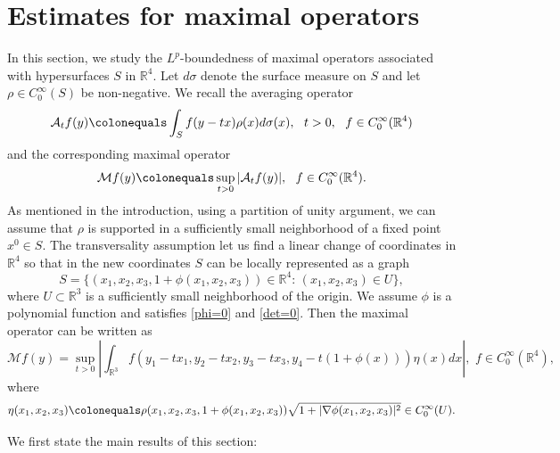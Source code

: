 \documentclass[a4paper, 11pt]{article}
\theoremstyle{plain}
\theoremstyle{definition}
\theoremstyle{lemma}
\theoremstyle{Remark}
\theoremstyle{proposition}
\theoremstyle{corollary}
\theoremstyle{example}
\theoremstyle{assumption}
\begin{document}


\section{Estimates for maximal operators }
In this section, we study the $L^p$-boundedness of maximal operators associated with hypersurfaces $S$ in $\mathbb{R}^4$.   Let $d\sigma$ denote the surface measure on $S$ and let
 $\rho\in C_0^{\infty}(S)$ be non-negative. We recall the averaging operator
 \begin{equation*}
 \mathcal{A}_tf(y)\colonequals \int_Sf(y-tx)\rho(x)d\sigma(x),\,\,\,\,t>0,\,\,\,\,f\in C^{\infty}_0(\mathbb{R}^4)
 \end{equation*}
 and  the corresponding  maximal operator
 \begin{equation*}
 \mathcal{M}f(y)\colonequals \sup_{t>0}|\mathcal{A}_tf(y)|, \,\,\,\,f\in C^{\infty}_0(\mathbb{R}^4).
 \end{equation*}
As mentioned in the introduction, using a partition of unity argument, we can assume that $\rho$ is supported in a sufficiently small neighborhood of a fixed point $x^0\in S.$ The transversality assumption let us find a linear change of coordinates in $\mathbb{R}^4$ so that in the new coordinates $S$ can be locally represented as a graph
\begin{equation}\label{S4}
S=\{(x_1,x_2,x_3, 1+\phi(x_1,x_2,x_3))\in \mathbb{R}^{4}:\,(x_1,x_2,x_3)\in U\},
\end{equation}
where $U\subset \mathbb{R}^3$ is a sufficiently small neighborhood of the origin.
 We assume $\phi$ is a polynomial function and satisfies \eqref{phi=0} and \eqref{det=0}.
  Then the maximal  operator  can be written as
 \begin{equation}\label{M}
 \mathcal{M}f(y)= \sup_{t>0}\left| \int_{\mathbb{R}^3}f(y_1-tx_1, y_2-tx_2, y_3-tx_3, y_4-t(1+\phi(x)))\eta(x)dx\right|, \,\,f\in C^{\infty}_0(\mathbb{R}^4),
 \end{equation}
  where  $$\eta(x_1,x_2,x_3)\colonequals \rho(x_1,x_2,x_3,1+\phi(x_1,x_2,x_3))\sqrt{1+|\nabla \phi(x_1,x_2,x_3)|^2}\in C^{\infty}_0(U).$$


We first state the main results of this section:
\end{document}

